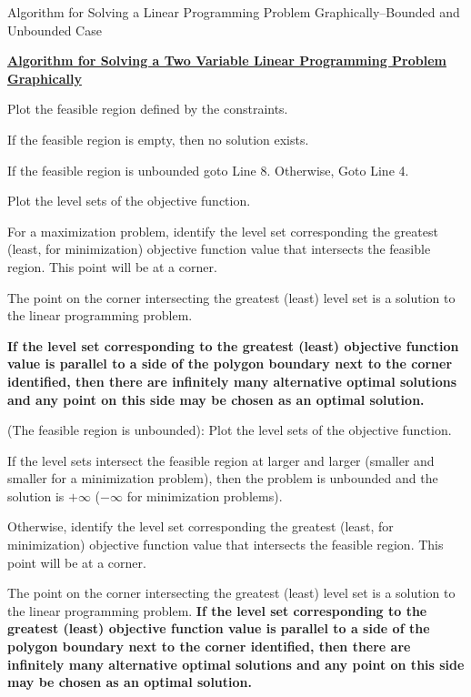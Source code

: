 \begin{algorithm}
\caption{Algorithm for Solving a Linear Programming Problem Graphically--Bounded and Unbounded Case}
\label{alg:GraphLPAlmostGeneral}
\begin{center}
\begin{minipage}[t]{\textwidth-1em}
\underline{\textbf{Algorithm for Solving a Two Variable Linear Programming Problem Graphically}}
\begin{enumerate*}
\item Plot the feasible region defined by the constraints.
\item If the feasible region is empty, then no solution exists.
\item If the feasible region is unbounded goto Line 8. Otherwise, Goto Line 4.
\item Plot the level sets of the objective function.
\item For a maximization problem, identify the level set corresponding the greatest (least, for minimization) objective function value that intersects the feasible region. This point will be at a corner. 
\item The point on the corner intersecting the greatest (least) level set is a solution to the linear programming problem. 
\item \textbf{If the level set corresponding to the greatest (least) objective function value is parallel to a side of the polygon boundary next to the corner identified, then there are infinitely many alternative optimal solutions and any point on this side may be chosen as an optimal solution.} 
\item (The feasible region is unbounded): Plot the level sets of the objective function.
\item If the level sets intersect the feasible region at larger and larger (smaller and smaller for a minimization problem), then the problem is unbounded and the solution is $+\infty$ ($-\infty$ for minimization problems). 
\item Otherwise, identify the level set corresponding the greatest (least, for minimization) objective function value that intersects the feasible region. This point will be at a corner. 
\item The point on the corner intersecting the greatest (least) level set is a solution to the linear programming problem. 
\textbf{If the level set corresponding to the greatest (least) objective function value is parallel to a side of the polygon boundary next to the corner identified, then there are infinitely many alternative optimal solutions and any point on this side may be chosen as an optimal solution.} 
\end{enumerate*}
\end{minipage}
\end{center}
\end{algorithm}

